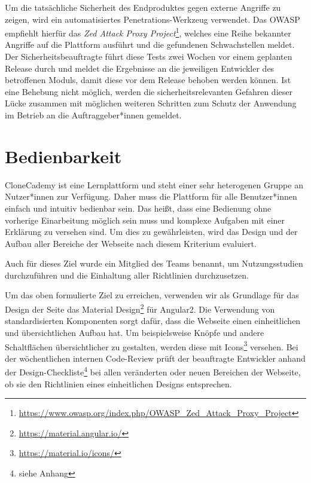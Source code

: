 \documentclass[accentcolor=tud0b,12pt,paper=a4]{tudreport}
\begin{document}
Um die tatsächliche Sicherheit des Endproduktes gegen externe Angriffe zu zeigen, wird ein automatisiertes Penetrations-Werkzeug verwendet. Das OWASP empfiehlt hierfür das \emph{Zed Attack Proxy Project}\footnote{\href{https://www.owasp.org/index.php/OWASP\_Zed\_Attack\_Proxy\_Project}{https://www.owasp.org/index.php/OWASP\_Zed\_Attack\_Proxy\_Project}}, welches eine Reihe bekannter Angriffe auf die Plattform ausführt und die gefundenen Schwachstellen meldet. Der Sicherheitsbeauftragte führt diese Tests zwei Wochen vor einem geplanten Release durch und meldet die Ergebnisse an die jeweiligen Entwickler des betroffenen Moduls, damit diese vor dem Release behoben werden können. Ist eine Behebung nicht möglich, werden die sicherheitsrelevanten Gefahren dieser Lücke zusammen mit möglichen weiteren Schritten zum Schutz der Anwendung im Betrieb an die Auftraggeber*innen gemeldet.
\pagebreak

\section{Bedienbarkeit}
CloneCademy ist eine Lernplattform und steht einer sehr heterogenen Gruppe an Nutzer*innen zur Verfügung. Daher muss die Plattform für alle Benutzer*innen einfach und intuitiv bedienbar sein. Das heißt, dass eine Bedienung ohne vorherige Einarbeitung möglich sein muss und komplexe Aufgaben mit einer Erklärung zu versehen sind. Um dies zu gewährleisten, wird das Design und der Aufbau aller Bereiche der Webseite nach diesem Kriterium evaluiert.

Auch für dieses Ziel wurde ein Mitglied des Teams benannt, um Nutzungsstudien durchzuführen und die Einhaltung aller Richtlinien durchzusetzen.

Um das oben formulierte Ziel zu erreichen, verwenden wir als Grundlage für das Design der Seite das Material Design\footnote{\href{https://material.angular.io/}{https://material.angular.io/}} für Angular2. Die Verwendung von standardisierten Komponenten sorgt dafür, dass die Webseite einen einheitlichen und übersichtlichen Aufbau hat. Um beispielsweise Knöpfe und andere Schaltflächen übersichtlicher zu gestalten, werden diese mit Icons\footnote{\href{https://material.io/icons/}{https://material.io/icons/}} versehen. Bei der wöchentlichen internen Code-Review prüft der beauftragte Entwickler anhand der Design-Checkliste\footnote{siehe Anhang} bei allen veränderten oder neuen Bereichen der Webseite, ob sie den Richtlinien eines einheitlichen Designs entsprechen.
\end{document}
